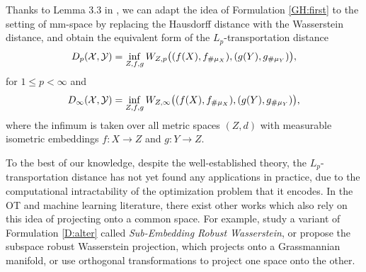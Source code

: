 Thanks to Lemma 3.3 in \citep{Sturm06}, we can adapt the idea of Formulation \eqref{GH:first}
to the setting of mm-space by replacing the Hausdorff distance with the Wasserstein distance,
and obtain the equivalent form of the $L_p$-transportation distance
\begin{align}
   \label{D:alter}
  D_p(\mathcal X, \mathcal Y) =
  \inf_{Z, f, g} W_{Z, p} \big( (f(X), f_{\# \mu_X}), (g(Y), g_{\# \mu_Y}) \big),
\end{align}
for $1 \leq p < \infty$ and
\begin{align}
   \label{D:alter_infty}
  D_{\infty}(\mathcal X, \mathcal Y) =
  \inf_{Z, f, g} W_{Z, \infty}\big( (f(X), f_{\# \mu_X} ), (g(Y), g_{\# \mu_Y} ) \big),
\end{align}
where the infimum is taken over all metric spaces $(Z,d)$ with measurable isometric embeddings
$f: X \to Z$ and $g: Y \to Z$.

To the best of our knowledge, despite the well-established theory,
the $L_p$-transportation distance has not yet found any applications in practice,
due to the computational intractability of the optimization problem that it encodes.
In the OT and machine learning literature, there exist other works which also rely on
this idea of projecting onto a common space.
For example, \citet{Alaya22} study a variant of Formulation \eqref{D:alter} called
\textit{Sub-Embedding Robust Wasserstein}, or
\citet{Paty19} propose the subspace robust Wasserstein projection,
which projects onto a Grassmannian manifold, or \citet{Cai22} use orthogonal transformations
to project one space onto the other.

